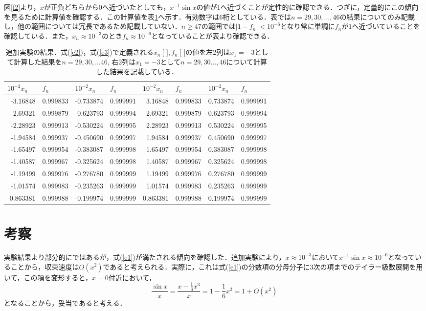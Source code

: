 \documentclass[fleqn, a4paper. 12pt]{ltjsarticle} %
\begin{document}
    図\ref{f2}より，$x$が正負どちらから$0$へ近づいたとしても，$x^{-1}\sin x$の値が$1$へ近づくことが定性的に確認できる．つぎに，定量的にこの傾向を見るために計算値を確認する．この計算値を表\ref{t2}へ示す．有効数字は6桁としている．表では$n=29, 30, ..., 46$の結果についてのみ記載し，他の範囲については冗長であるため記載していない．$n\geq 47$の範囲では$|1-f_n|<10^{-6}$となり常に単調に$f_n$が$1$へ近づいていることを確認している．また，$x_n\approx 10^{-3}$のとき$f_n\approx 10^{-6}$となっていることが表より確認できる．
    
    \begin{table}[tb]
        \centering
        \caption{追加実験の結果．式(\ref{e2})，式(\ref{e3})で定義される$x_n\ \mbox{[-]}, f_n\ \mbox{[-]}$の値を左2列は$x_1 = -3$として計算した結果を$n=29,30,...46$, 右2列は$x_1=-3$として$n=29,30...,46$について計算した結果を記載している．}
        \begin{tabular}{rr|rr|rr|rr}
\hline
\multicolumn{1}{l}{$10^{-2}x_n$}&\multicolumn{1}{l|}{$f_n$}&\multicolumn{1}{l}{$10^{-2}x_n$}&\multicolumn{1}{l|}{$f_n$}&\multicolumn{1}{l}{$10^{-2}x_n$}&\multicolumn{1}{l|}{$f_n$}&\multicolumn{1}{l}{$10^{-2}x_n$}&\multicolumn{1}{l}{$f_n$}\\
\hline
-3.16848&0.999833&-0.733874&0.999991&3.16848&0.999833&0.733874&0.999991\\
-2.69321&0.999879&-0.623793&0.999994&2.69321&0.999879&0.623793&0.999994\\
-2.28923&0.999913&-0.530224&0.999995&2.28923&0.999913&0.530224&0.999995\\
-1.94584&0.999937&-0.450690&0.999997&1.94584&0.999937&0.450690&0.999997\\
-1.65497&0.999954&-0.383087&0.999998&1.65497&0.999954&0.383087&0.999998\\
-1.40587&0.999967&-0.325624&0.999998&1.40587&0.999967&0.325624&0.999998\\
-1.19499&0.999976&-0.276780&0.999999&1.19499&0.999976&0.276780&0.999999\\
-1.01574&0.999983&-0.235263&0.999999&1.01574&0.999983&0.235263&0.999999\\
-0.863381&0.999988&-0.199974&0.999999&0.863381&0.999988&0.199974&0.999999\\
\hline
        \end{tabular}
        \label{t2}
    \end{table}
    \section{考察}
    実験結果より部分的にではあるが，式(\ref{e1})が満たされる傾向を確認した．追加実験により，$x \approx 10^{-3}$において$x^{-1}\sin x \approx 10^{-6}$となっていることから，収束速度は$O(x^2)$であると考えられる．実際に，これは式(\ref{e1})の分数項の分母分子に3次の項までのテイラー級数展開を用いて，この項を変形すると，$x=0$付近において，
    \begin{equation}
        \frac{\sin x}{x} = \frac{x -\frac{1}{6}x^3}{x} = 1- \frac{1}{6}x^2 = 1 + O(x^2)
    \end{equation}
    となることから，妥当であると考える．
    
\end{document}
